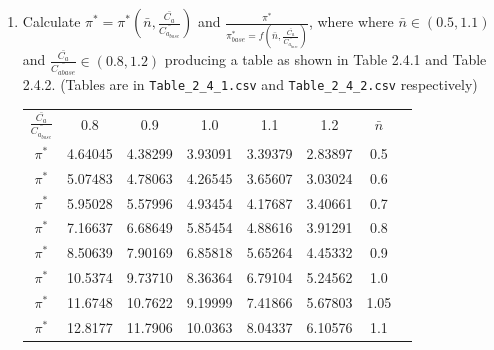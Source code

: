 \documentclass[12pt,english]{article}
\begin{document}
\begin{enumerate}
    \item Calculate $\pi^{*} = \pi^{*} (\bar{n}, \frac{\bar{C_{a}}}{\bar{C_{a_{base}}}})$ and $\frac{\pi^{*}}{\pi^{*}_{base} = f (\bar{n}, \frac{\bar{C_{a}}}{\bar{C_{a_{base}}}})}$, where where $\bar{n} \in (0.5, 1.1)$ and $\frac{\bar{C_a}}{\bar{C_{a base}}} \in (0.8, 1.2)$ producing a table as shown in Table 2.4.1 and Table 2.4.2. (Tables are in \verb|Table_2_4_1.csv| and \verb|Table_2_4_2.csv| respectively)
    \begin{center}
        \begin{tabular}{ c c c c c c c c }
            $\frac{\bar{C_{a}}}{\bar{C_{a_{base}}}}$ & 0.8 & 0.9 & 1.0 & 1.1 & 1.2 & $\bar{n}$ \\
            $\pi^{*}$ & 4.64045 & 4.38299 & 3.93091 & 3.39379 & 2.83897 & 0.5 \\
            $\pi^{*}$ & 5.07483 & 4.78063 & 4.26545 & 3.65607 & 3.03024 & 0.6 \\
            $\pi^{*}$ & 5.95028 & 5.57996 & 4.93454 & 4.17687 & 3.40661 & 0.7 \\
            $\pi^{*}$ & 7.16637 & 6.68649 & 5.85454 & 4.88616 & 3.91291 & 0.8 \\
            $\pi^{*}$ & 8.50639 & 7.90169 & 6.85818 & 5.65264 & 4.45332 & 0.9 \\
            $\pi^{*}$ & 10.5374 & 9.73710 & 8.36364 & 6.79104 & 5.24562 & 1.0 \\
            $\pi^{*}$ & 11.6748 & 10.7622 & 9.19999 & 7.41866 & 5.67803 & 1.05 \\
            $\pi^{*}$ & 12.8177 & 11.7906 & 10.0363 & 8.04337 & 6.10576 & 1.1 \\
        \end{tabular}

        \vspace*{3pt}


\end{center}
\end{enumerate}
\end{document}
